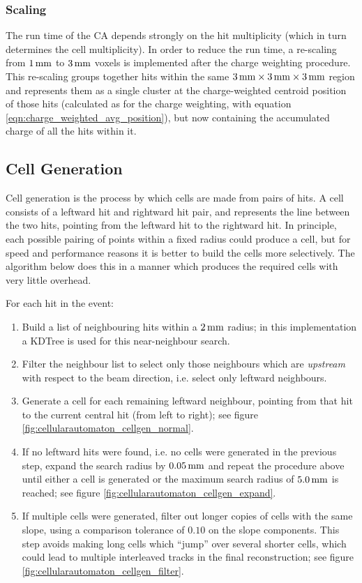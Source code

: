 \subsubsection{Scaling}\label{sec:cellularautomaton_scaling}
The run time of the \ac{CA} depends strongly on the hit multiplicity (which in turn determines the cell multiplicity). In order to reduce the run time, a re-scaling from $1\,\mathrm{mm}$ to $3\,\mathrm{mm}$ voxels is implemented after the charge weighting procedure. This re-scaling groups together hits within the same $3\,\mathrm{mm} \times 3\,\mathrm{mm} \times 3\,\mathrm{mm}$ region and represents them as a single cluster at the charge-weighted centroid position of those hits (calculated as for the charge weighting, with equation \ref{eqn:charge_weighted_avg_position}), but now containing the accumulated charge of all the hits within it.

\subsection{Cell Generation}\label{sec:cellularautomaton_cell_generation}
Cell generation is the process by which cells are made from pairs of hits. A cell consists of a leftward hit and rightward hit pair, and represents the line between the two hits, pointing from the leftward hit to the rightward hit.  In principle, each possible pairing of points within a fixed radius could produce a cell, but for speed and performance reasons it is better to build the cells more selectively. The algorithm below does this in a manner which produces the required cells with very little overhead.

For each hit in the event:
\begin{enumerate}
	\item Build a list of neighbouring hits within a $2\,\mathrm{mm}$ radius; in this implementation a \ac{KDTree} is used for this near-neighbour search.
	\item Filter the neighbour list to select only those neighbours which are \emph{upstream} with respect to the beam direction, i.e. select only leftward neighbours.
	\item Generate a cell for each remaining leftward neighbour, pointing from that hit to the current central hit (from left to right); see figure \ref{fig:cellularautomaton_cellgen_normal}.
	\item If no leftward hits were found, i.e. no cells were generated in the previous step, expand the search radius by $0.05\,\mathrm{mm}$ and repeat the procedure above until either a cell is generated or the maximum search radius of $5.0\,\mathrm{mm}$ is reached; see figure \ref{fig:cellularautomaton_cellgen_expand}.
	\item If multiple cells were generated, filter out longer copies of cells with the same slope, using a comparison tolerance of $0.10$ on the slope components. This step avoids making long cells which ``jump'' over several shorter cells, which could lead to multiple interleaved tracks in the final reconstruction; see figure \ref{fig:cellularautomaton_cellgen_filter}.
\end{enumerate}

